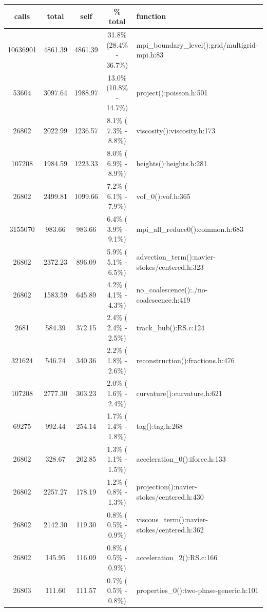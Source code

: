 \begin{table}  
\begin{tabular}{c|c|c|c|l}
  calls  &  total  &   self  & \% total  & function \\ \hline
  10636901 &  4861.39 &  4861.39  &   31.8\% (28.4\% - 36.7\%) &   mpi\_boundary\_level():grid/multigrid-mpi.h:83\\
     53604 &  3097.64 &  1988.97  &   13.0\% (10.8\% - 14.7\%) &   project():poisson.h:501\\
     26802 &  2022.99 &  1236.57  &    8.1\% ( 7.3\% -  8.8\%) &   viscosity():viscosity.h:173\\
    107208 &  1984.59 &  1223.33  &    8.0\% ( 6.9\% -  8.9\%) &   heights():heights.h:281\\
     26802 &  2499.81 &  1099.66  &    7.2\% ( 6.1\% -  7.9\%) &   vof\_0():vof.h:365\\
   3155070 &  983.66  & 983.66    &  6.4\% ( 3.9\% -  9.1\%)   & mpi\_all\_reduce0():common.h:683\\
     26802 &  2372.23 &  896.09   &   5.9\% ( 5.1\% -  6.5\%)  &  advection\_term():navier-stokes/centered.h:323\\
     26802 &  1583.59 &  645.89   &   4.2\% ( 4.1\% -  4.3\%)  &  no\_coalescence():./no-coalescence.h:419\\
      2681 &  584.39  & 372.15    &  2.4\% ( 2.4\% -  2.5\%)   & track\_bub():RS.c:124\\
    321624 &  546.74  & 340.36    &  2.2\% ( 1.8\% -  2.6\%)   & reconstruction():fractions.h:476\\
    107208 &  2777.30 &  303.23   &   2.0\% ( 1.6\% -  2.4\%)  &  curvature():curvature.h:621\\
     69275 &  992.44  & 254.14    &  1.7\% ( 1.4\% -  1.8\%)   & tag():tag.h:268\\
     26802 &  328.67  & 202.85    &  1.3\% ( 1.1\% -  1.5\%)   & acceleration\_0():iforce.h:133\\
     26802 &  2257.27 &  178.19   &   1.2\% ( 0.8\% -  1.3\%)  &  projection():navier-stokes/centered.h:430\\
     26802 &  2142.30 &  119.30   &   0.8\% ( 0.5\% -  0.9\%)  &  viscous\_term():navier-stokes/centered.h:362\\
     26802 &  145.95  & 116.09    &  0.8\% ( 0.5\% -  0.9\%)   & acceleration\_2():RS.c:166\\
     26803 &  111.60  & 111.57    &  0.7\% ( 0.5\% -  0.8\%)   & properties\_0():two-phase-generic.h:101\\

\end{tabular}
\end{table}
